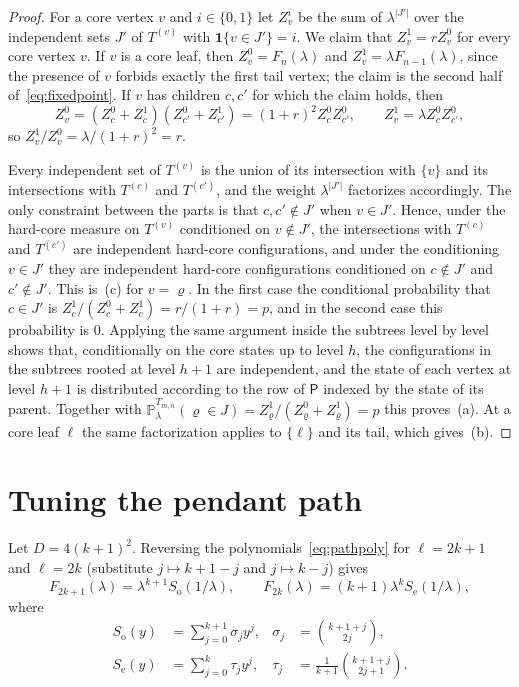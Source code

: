 \documentclass{amsart}
\theoremstyle{definition}
\theoremstyle{remark}
\numberwithin{equation}{section}
\newcommand{\Prob}{\mathbb{P}}
\newcommand{\abs}[1]{\lvert #1\rvert}
\begin{document}
\begin{proof}
For a core vertex $v$ and $i\in\{0,1\}$ let $Z^i_v$ be the sum of $\lambda^{\abs{J'}}$ over the independent sets $J'$ of $T^{(v)}$ with $\mathbf 1\{v\in J'\}=i$. We claim that $Z^1_v=rZ^0_v$ for every core vertex $v$. If $v$ is a core leaf, then $Z^0_v=F_n(\lambda)$ and $Z^1_v=\lambda F_{n-1}(\lambda)$, since the presence of $v$ forbids exactly the first tail vertex; the claim is the second half of~\eqref{eq:fixedpoint}. If $v$ has children $c,c'$ for which the claim holds, then
\[
Z^0_v=(Z^0_c+Z^1_c)(Z^0_{c'}+Z^1_{c'})=(1+r)^2Z^0_cZ^0_{c'},\qquad Z^1_v=\lambda Z^0_cZ^0_{c'},
\]
so $Z^1_v/Z^0_v=\lambda/(1+r)^2=r$.

Every independent set of $T^{(v)}$ is the union of its intersection with $\{v\}$ and its intersections with $T^{(c)}$ and $T^{(c')}$, and the weight $\lambda^{\abs{J'}}$ factorizes accordingly. The only constraint between the parts is that $c,c'\notin J'$ when $v\in J'$. Hence, under the hard-core measure on $T^{(v)}$ conditioned on $v\notin J'$, the intersections with $T^{(c)}$ and $T^{(c')}$ are independent hard-core configurations, and under the conditioning $v\in J'$ they are independent hard-core configurations conditioned on $c\notin J'$ and $c'\notin J'$. This is~(c) for $v=\varrho$. In the first case the conditional probability that $c\in J'$ is $Z^1_c/(Z^0_c+Z^1_c)=r/(1+r)=p$, and in the second case this probability is $0$. Applying the same argument inside the subtrees level by level shows that, conditionally on the core states up to level $h$, the configurations in the subtrees rooted at level $h+1$ are independent, and the state of each vertex at level $h+1$ is distributed according to the row of $\mathsf P$ indexed by the state of its parent. Together with $\Prob^{T_{m,n}}_\lambda(\varrho\in J)=Z^1_\varrho/(Z^0_\varrho+Z^1_\varrho)=p$ this proves~(a). At a core leaf $\ell$ the same factorization applies to $\{\ell\}$ and its tail, which gives~(b).
\end{proof}

\section{Tuning the pendant path}\label{sec:tuning}

Let $D=4(k+1)^2$. Reversing the polynomials~\eqref{eq:pathpoly} for $\ell=2k+1$ and $\ell=2k$ (substitute $j\mapsto k+1-j$ and $j\mapsto k-j$) gives
\begin{equation}\label{eq:reverse}
F_{2k+1}(\lambda)=\lambda^{k+1}S_{\mathrm o}(1/\lambda),\qquad F_{2k}(\lambda)=(k+1)\lambda^kS_{\mathrm e}(1/\lambda),
\end{equation}
where
\begin{align*}
S_{\mathrm o}(y)&=\sum_{j=0}^{k+1}\sigma_jy^j, & \sigma_j&=\binom{k+1+j}{2j},\\
S_{\mathrm e}(y)&=\sum_{j=0}^{k}\tau_jy^j, & \tau_j&=\frac{1}{k+1}\binom{k+1+j}{2j+1}.
\end{align*}
\end{document}
